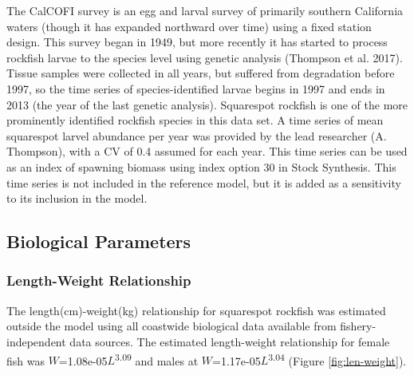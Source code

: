 \documentclass[11pt,
  english,
  a4paper,
]{article}
\begin{document}
The CalCOFI survey is an egg and larval survey of primarily southern California waters (though it has expanded northward over time) using a fixed station design. This survey began in 1949, but more recently it has started to process rockfish larvae to the species level using genetic analysis {(Thompson et al. 2017)\leavevmode\tagmcend\tagstructend}. Tissue samples were collected in all years, but suffered from degradation before 1997, so the time series of species-identified larvae begins in 1997 and ends in 2013 (the year of the last genetic analysis). Squarespot rockfish is one of the more prominently identified rockfish species in this data set. A time series of mean squarespot larvel abundance per year was provided by the lead researcher (A. Thompson), with a CV of 0.4 assumed for each year. This time series can be used as an index of spawning biomass using index option 30 in Stock Synthesis. This time series is not included in the reference model, but it is added as a sensitivity to its inclusion in the model.

\leavevmode\tagmcend\tagstructend\par


\hypertarget{biological-parameters}{%
\subsection{Biological Parameters}\label{biological-parameters}}

\leavevmode\tagmcend\tagstructend


\hypertarget{length-weight-relationship}{%
\subsubsection{Length-Weight Relationship}\label{length-weight-relationship}}

\leavevmode\tagmcend\tagstructend


The length(cm)-weight(kg) relationship for squarespot rockfish was estimated outside the model using all coastwide biological data available from fishery-independent data sources. The estimated length-weight relationship for female fish was {\(W\)\leavevmode\tagmcend\tagstructend}=1.08e-05{\(L\)\leavevmode\tagmcend\tagstructend}\textsuperscript{3.09} and males at {\(W\)\leavevmode\tagmcend\tagstructend}=1.17e-05{\(L\)\leavevmode\tagmcend\tagstructend}\textsuperscript{3.04} (Figure \ref{fig:len-weight}).
\end{document}
